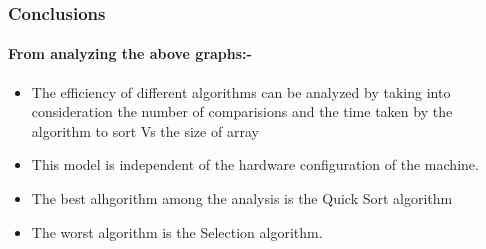 \documentclass{beamer}
\begin{document}
\begin{frame}
\frametitle{Conclusions}
\framesubtitle{From analyzing the above graphs:-}
\setlength{\unitlength}{1.8cm}
\begin{itemize}
\item The efficiency of different algorithms can be analyzed by taking into consideration the number of comparisions and the time taken by the algorithm to sort Vs the size of array
\item This model is independent of the hardware configuration of the machine.
\item The best alhgorithm among the analysis is the Quick Sort algorithm
\item The worst algorithm is the Selection algorithm.
\end{itemize}
\end{frame}
\end{document}
